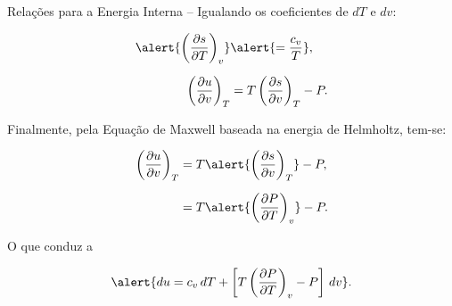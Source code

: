 \begin{frame}[allowframebreaks]{Relações para a Energia Interna --}
        \pagebreak
        Igualando os coeficientes de \alert{$dT$} e \alert{$dv$}:

        \begin{align*}
            \alert{\left(\frac{\partial s}{\partial T}\right)_v}
            &\alert{= \frac{c_v}{T}},
            \\[\medskipamount]
            \left(\frac{\partial u}{\partial v}\right)_T
            &= T\left(\frac{\partial s}{\partial v}\right)_T - P.
        \end{align*}

        \pagebreak
        Finalmente, pela Equação de Maxwell baseada na energia de Helmholtz, tem-se:

        \begin{align*}
            \left(\frac{\partial u}{\partial v}\right)_T
            &= T\alert{\left(\frac{\partial s}{\partial v}\right)_T} - P,
            \\[\medskipamount]
            &= T\alert{\left(\frac{\partial P}{\partial T}\right)_v} - P.
        \end{align*}

        O que conduz a

        \begin{equation*}
            \alert{
                du = c_v\,dT +
                \left[
                    T\left(
                        \frac{\partial P}{\partial T}
                    \right)_v - P
                \right]\,dv
            }.
        \end{equation*}

    \end{frame}

